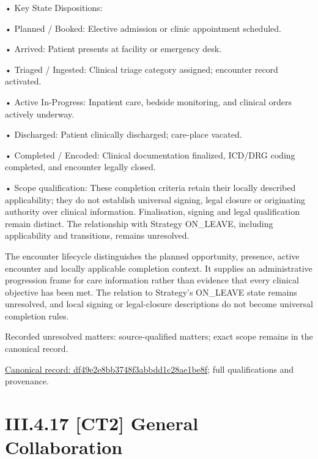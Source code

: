 •
Key State Dispositions:



•
Planned / Booked: Elective admission or clinic appointment scheduled.



•
Arrived: Patient presents at facility or emergency desk.



•
Triaged / Ingested: Clinical triage category assigned; encounter record activated.



•
Active In-Progress: Inpatient care, bedside monitoring, and clinical orders actively underway.



•
Discharged: Patient clinically discharged; care-place vacated.



•
Completed / Encoded: Clinical documentation finalized, ICD/DRG coding completed, and encounter legally closed.



•
Scope qualification: These completion criteria retain their locally described applicability; they do not establish universal signing, legal closure or originating authority over clinical information. Finalisation, signing and legal qualification remain distinct. The relationship with Strategy ON\_LEAVE, including applicability and transitions, remains unresolved.



The encounter lifecycle distinguishes the planned opportunity, presence, active encounter and locally applicable completion context. It supplies an administrative progression frame for care information rather than evidence that every clinical objective has been met. The relation to Strategy's ON\_LEAVE state remains unresolved, and local signing or legal-closure descriptions do not become universal completion rules.


{\small Recorded unresolved matters: source-qualified matters; exact scope remains in the canonical record.}\par
{\footnotesize \href{../../../../continuum/business/business-process/df49e2e8bb3748f3abbdd1c28ae1be8f.md}{Canonical record: df49e2e8bb3748f3abbdd1c28ae1be8f}; full qualifications and provenance.}\par
\section*{III.4.17 [CT2] General Collaboration}
\label{navigation:III.4.17}

